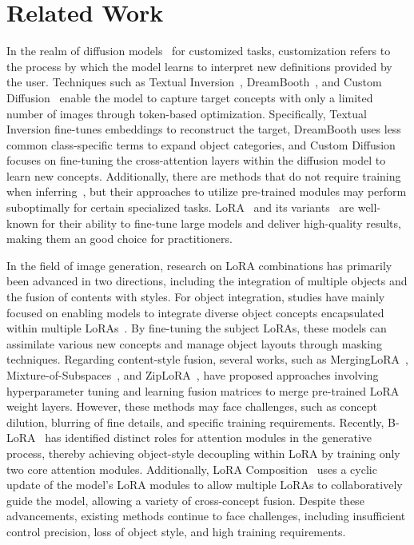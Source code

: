 \section{Related Work}
\label{sec:relatedwork}

 In the realm of diffusion models~\cite{rombach2022high} for customized tasks, customization refers to the process by which the model learns to interpret new definitions provided by the user.
%
Techniques such as Textual Inversion~\cite{zhang2023inversion,alaluf2023neural,voynov2023p+}, DreamBooth~\cite{ruiz2023dreambooth}, and Custom Diffusion~\cite{kumari2023multi} enable the model to capture target concepts with only a limited number of images through token-based optimization. 
%
Specifically, Textual Inversion fine-tunes embeddings to reconstruct the target, DreamBooth uses less common class-specific terms to expand object categories, and Custom Diffusion focuses on fine-tuning the cross-attention layers within the diffusion model to learn new concepts. 
%
Additionally, there are methods that do not require training 
when inferring~\cite{xie2023smartbrush,xiao2024fastcomposer,avrahami2023break,shi2024instantbooth}, but their approaches to utilize pre-trained modules may perform suboptimally for certain specialized tasks.
%
LoRA~\cite{LoRA} and its variants~\cite{hayou2024lora+,zhang2023lora,zhou2024lora,zhou2024lora,kopiczko2023vera,zi2023delta,ren2024melora} are well-known for their ability to fine-tune large models and deliver high-quality results, making them an good choice for practitioners.


 In the field of image generation, research on LoRA combinations has primarily been advanced in two directions, including the integration of multiple objects and the fusion of contents with styles.
%
For object integration, studies have mainly focused on enabling models to integrate diverse object concepts encapsulated within multiple LoRAs~\cite{gu2024mix,LoRA-Composer,jiang2024mc,dong2024continually,liu2023cones}. 
%
By fine-tuning the subject LoRAs, these models can assimilate various new concepts and manage object layouts through masking techniques. 
%
Regarding content-style fusion, several works, such as MergingLoRA~\cite{Mergingloras}, Mixture-of-Subspaces~\cite{wu2024mixture}, and ZipLoRA~\cite{ZipLoRA}, have proposed approaches involving hyperparameter tuning and learning fusion matrices to merge pre-trained LoRA weight layers.
%
However, these methods may face challenges, such as concept dilution, blurring of fine details, and specific training requirements. 
%
Recently, B-LoRA~\cite{B-LoRA} has identified distinct roles for attention modules in the generative process, thereby achieving object-style decoupling within LoRA by training only two core attention modules. 
%
Additionally, LoRA Composition~\cite{Multi-LoRAComposition} uses a cyclic update of the model's LoRA modules to allow multiple LoRAs to collaboratively guide the model, allowing a variety of cross-concept fusion. 
%
Despite these advancements, existing methods continue to face challenges, including insufficient control precision, loss of object style, and high training requirements.